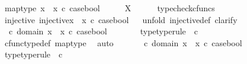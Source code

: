 \begin{isabellebody}
\ map{\isacharunderscore}{\kern0pt}type{\isacharcolon}{\kern0pt}\ {\isachardoublequoteopen}{\isacharparenleft}{\kern0pt}x{}\ {\isasymamalg}\ x{}{\isacharparenright}{\kern0pt}\ {\isasymcirc}\isactrlsub c\ case{\isacharunderscore}{\kern0pt}bool\ \ \ {\isacharcolon}{\kern0pt}\ {\isasymOmega}\ {\isasymrightarrow}\ X{\isachardoublequoteclose}\isanewline
\ \ \ \ \isamarkupfalse%
\ typecheck{\isacharunderscore}{\kern0pt}cfuncs\isanewline
\ \ \isamarkupfalse%
\ injective{\isacharcolon}{\kern0pt}\ {\isachardoublequoteopen}injective{\isacharparenleft}{\kern0pt}{\isacharparenleft}{\kern0pt}x{}\ {\isasymamalg}\ x{}{\isacharparenright}{\kern0pt}\ {\isasymcirc}\isactrlsub c\ case{\isacharunderscore}{\kern0pt}bool{\isacharparenright}{\kern0pt}{\isachardoublequoteclose}\isanewline
\ \ \isamarkupfalse%
{\isacharparenleft}{\kern0pt}unfold\ injective{\isacharunderscore}{\kern0pt}def{\isacharcomma}{\kern0pt}\ clarify{\isacharparenright}{\kern0pt}\isanewline
\ \ \ \ \isamarkupfalse%
\ {\isasymomega}{}\ {\isasymomega}{}\ \isanewline
\ \ \ \ \isamarkupfalse%
\ {\isachardoublequoteopen}{\isasymomega}{}\ {\isasymin}\isactrlsub c\ domain\ {\isacharparenleft}{\kern0pt}x{}\ {\isasymamalg}\ x{}\ {\isasymcirc}\isactrlsub c\ case{\isacharunderscore}{\kern0pt}bool{\isacharparenright}{\kern0pt}{\isachardoublequoteclose}\isanewline
\ \ \ \ \isamarkupfalse%
\ \isamarkupfalse%
\ {\isasymomega}{}{\isacharunderscore}{\kern0pt}type{\isacharbrackleft}{\kern0pt}type{\isacharunderscore}{\kern0pt}rule{\isacharbrackright}{\kern0pt}{\isacharcolon}{\kern0pt}\ {\isachardoublequoteopen}{\isasymomega}{}\ {\isasymin}\isactrlsub c\ {\isasymOmega}{\isachardoublequoteclose}\isanewline
\ \ \ \ \ \ \isamarkupfalse%
\ cfunc{\isacharunderscore}{\kern0pt}type{\isacharunderscore}{\kern0pt}def\ map{\isacharunderscore}{\kern0pt}type\ \isamarkupfalse%
\ auto\isanewline
\ \ \ \ \isamarkupfalse%
\ {\isachardoublequoteopen}{\isasymomega}{}\ {\isasymin}\isactrlsub c\ domain\ {\isacharparenleft}{\kern0pt}x{}\ {\isasymamalg}\ x{}\ {\isasymcirc}\isactrlsub c\ case{\isacharunderscore}{\kern0pt}bool{\isacharparenright}{\kern0pt}{\isachardoublequoteclose}\isanewline
\ \ \ \ \isamarkupfalse%
\ \isamarkupfalse%
\ {\isasymomega}{}{\isacharunderscore}{\kern0pt}type{\isacharbrackleft}{\kern0pt}type{\isacharunderscore}{\kern0pt}rule{\isacharbrackright}{\kern0pt}{\isacharcolon}{\kern0pt}\ {\isachardoublequoteopen}{\isasymomega}{}\ {\isasymin}\isactrlsub c\ {\isasymOmega}{\isachardoublequoteclose}\isanewline

\end{isabellebody}
